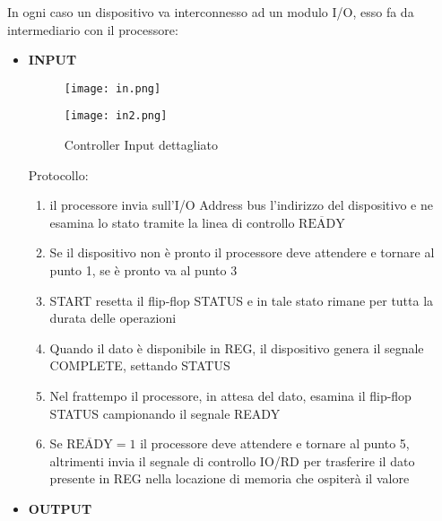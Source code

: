 \documentclass{article}
\begin{document}
\begin{itemize}
    In ogni caso un dispositivo va interconnesso ad un modulo I/O, esso fa da intermediario con il processore:

    \begin{itemize}
        \item \textbf{INPUT}

        \begin{figure}[ht]
        \centering
        \texttt{[image: in.png]}
        \label{fig:in_contr}
        \end{figure}

        \begin{figure}[ht]
        \centering
        \texttt{[image: in2.png]}
        \label{fig:in_contr2}
        \caption{Controller Input dettagliato}
        \end{figure}

        \newpage

        Protocollo:
        \begin{enumerate}
            \item il processore invia sull’I/O Address bus l’indirizzo del dispositivo e ne esamina lo stato tramite la linea di controllo $\overline{\text{READY}}$

            \item Se il dispositivo non è pronto il processore deve attendere e tornare al punto 1,  se è pronto va al punto 3

            \item START resetta il flip-flop STATUS e in tale stato rimane per tutta la durata delle operazioni

            \item Quando il dato è disponibile in REG, il dispositivo genera il segnale COMPLETE, settando STATUS

            \item Nel frattempo il processore, in attesa del dato, esamina il flip-flop STATUS campionando il segnale READY

            \item Se $\overline{\text{READY}}=1$ il processore deve attendere e tornare al punto 5, altrimenti invia il segnale di controllo IO/RD per trasferire il dato presente in REG nella locazione di memoria che ospiterà il valore \newline

        \end{enumerate}

        \item \textbf{OUTPUT}


\end{itemize}
\end{itemize}
\end{document}
